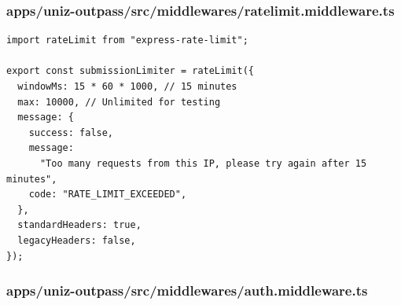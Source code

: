 \documentclass[11pt,a4paper,oneside]{article}
\begin{document}
\subsubsection*{apps/uniz-outpass/src/middlewares/ratelimit.middleware.ts}
\begin{lstlisting}
import rateLimit from "express-rate-limit";

export const submissionLimiter = rateLimit({
  windowMs: 15 * 60 * 1000, // 15 minutes
  max: 10000, // Unlimited for testing
  message: {
    success: false,
    message:
      "Too many requests from this IP, please try again after 15 minutes",
    code: "RATE_LIMIT_EXCEEDED",
  },
  standardHeaders: true,
  legacyHeaders: false,
});

\end{lstlisting}
\subsubsection*{apps/uniz-outpass/src/middlewares/auth.middleware.ts}
\end{document}
